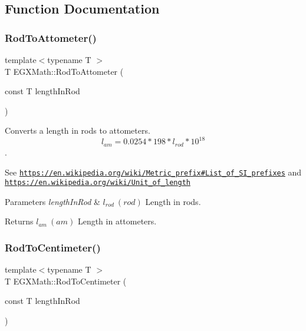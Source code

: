 \subsection{Function Documentation}
\mbox{\label{group___e_g_x_math-_conversions-_length_conversions-_imperial-_rod-_s_i_ga8ea230e8e68a945a135edff4ba01a449}} 
\subsubsection{\texorpdfstring{Rod\+To\+Attometer()}{RodToAttometer()}}
{\footnotesize\ttfamily template$<$typename T $>$ \\
T E\+G\+X\+Math\+::\+Rod\+To\+Attometer (\begin{DoxyParamCaption}\item[{const T}]{length\+In\+Rod }\end{DoxyParamCaption})}



Converts a length in rods to attometers. \[ l_{am}=0.0254 * 198 * l_{rod} * 10^{18} \]. 

See \href{https://en.wikipedia.org/wiki/Metric_prefix#List_of_SI_prefixes}{\tt https\+://en.\+wikipedia.\+org/wiki/\+Metric\+\_\+prefix\#\+List\+\_\+of\+\_\+\+S\+I\+\_\+prefixes} and \href{https://en.wikipedia.org/wiki/Unit_of_length}{\tt https\+://en.\+wikipedia.\+org/wiki/\+Unit\+\_\+of\+\_\+length} 
\begin{DoxyParams}{Parameters}
{\em length\+In\+Rod} & $ l_{rod}\ (rod)$ Length in rods. \\
\hline
\end{DoxyParams}
\begin{DoxyReturn}{Returns}
$ l_{am}\ (am)$ Length in attometers. 
\end{DoxyReturn}
\mbox{\label{group___e_g_x_math-_conversions-_length_conversions-_imperial-_rod-_s_i_ga606f24d4f57fa79ea29cd16903899849}} 
\subsubsection{\texorpdfstring{Rod\+To\+Centimeter()}{RodToCentimeter()}}
{\footnotesize\ttfamily template$<$typename T $>$ \\
T E\+G\+X\+Math\+::\+Rod\+To\+Centimeter (\begin{DoxyParamCaption}\item[{const T}]{length\+In\+Rod }\end{DoxyParamCaption})}




